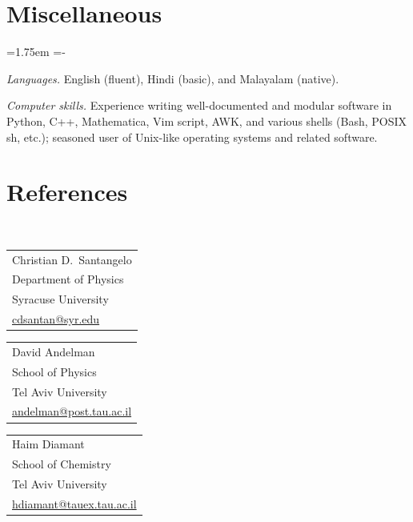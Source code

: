 \documentclass[10pt,a4paper,article,oneside]{memoir}
\def\email#1{\href{mailto:#1}{#1}}
\def\hangpars{%
  \leftskip=1.75em%
  \parindent=-\leftskip%
  \setsecindent{-\leftskip}%
  \setsubsecindent{-\leftskip}%
  \parskip=0pt
}
\begin{document}

\section{Miscellaneous}

\hangpars

\emph{Languages.\enspace} English (fluent), Hindi (basic), and Malayalam (native).

\emph{Computer skills.\enspace} Experience writing well-documented and modular software in Python, C++, Mathematica, Vim script, AWK, and various shells (Bash, POSIX sh, etc.); seasoned user of Unix-like operating systems and related software.


\section{References}

\phantom{}\\[-2em]

\begin{minipage}[t]{0.28\textwidth}
  \begin{tabular}{@{}l}
  Christian D.~Santangelo\\
  Department of Physics\\
  Syracuse University\\
  \email{cdsantan@syr.edu}
  \end{tabular}
\end{minipage}
%
\begin{minipage}[t]{0.28\textwidth}
  \begin{tabular}{@{}l}
  David Andelman\\
  School of Physics\\
  Tel Aviv University\\
  \email{andelman@post.tau.ac.il}
  \end{tabular}
\end{minipage}
%
\begin{minipage}[t]{0.28\textwidth}
  \begin{tabular}{@{}l}
  Haim Diamant\\
  School of Chemistry\\
  Tel Aviv University\\
  \email{hdiamant@tauex.tau.ac.il}
  \end{tabular}
\end{minipage}
\end{document}

